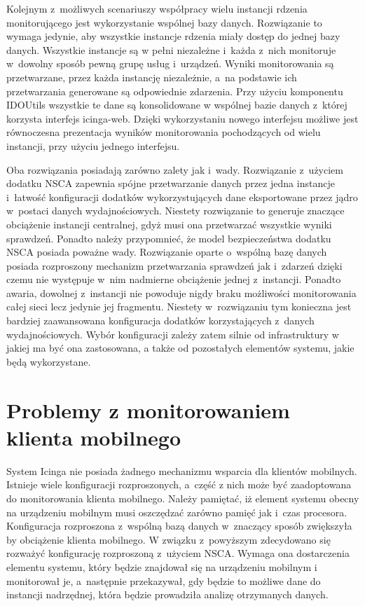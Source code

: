 Kolejnym z~możliwych scenariuszy współpracy wielu instancji rdzenia
monitorującego jest wykorzystanie wspólnej bazy danych. Rozwiązanie to
wymaga jedynie, aby wszystkie instancje rdzenia miały dostęp do jednej
bazy danych. Wszystkie instancje są w pełni niezależne i~każda z~nich
monitoruje w~dowolny sposób pewną grupę usług i~urządzeń. Wyniki
monitorowania są przetwarzane, przez każda instancję niezależnie, a~na
podstawie ich przetwarzania generowane są odpowiednie zdarzenia. Przy
użyciu komponentu IDOUtils wszystkie te dane są konsolidowane w
wspólnej bazie danych z~której korzysta interfejs icinga-web. Dzięki
wykorzystaniu nowego interfejsu możliwe jest równoczesna prezentacja
wyników monitorowania pochodzących od wielu instancji, przy użyciu
jednego interfejsu.

Oba rozwiązania posiadają zarówno zalety jak i~wady. Rozwiązanie
z~użyciem dodatku NSCA zapewnia spójne przetwarzanie danych przez
jedna instancje i~łatwość konfiguracji dodatków wykorzystujących dane
eksportowane przez jądro w~postaci danych wydajnościowych. Niestety
rozwiązanie to generuje znaczące obciążenie instancji centralnej, gdyż
musi ona przetwarzać wszystkie wyniki sprawdzeń. Ponadto należy
przypomnieć, że model bezpieczeństwa dodatku NSCA posiada poważne
wady. Rozwiązanie oparte o~wspólną bazę danych posiada rozproszony
mechanizm przetwarzania sprawdzeń jak i~zdarzeń dzięki czemu nie
występuje w~nim nadmierne obciążenie jednej z~instancji. Ponadto
awaria, dowolnej z~instancji nie powoduje nigdy braku możliwości
monitorowania całej sieci lecz jedynie jej fragmentu. Niestety
w~rozwiązaniu tym konieczna jest bardziej zaawansowana konfiguracja
dodatków korzystających z~danych wydajnościowych. Wybór konfiguracji
zależy zatem silnie od infrastruktury w jakiej ma być ona zastosowana,
a także od pozostałych elementów systemu, jakie będą wykorzystane.


\section[Problemy][Problemy z monitorowaniem klienta mobilnego]{Problemy z monitorowaniem klienta mobilnego}

System Icinga nie posiada żadnego mechanizmu wsparcia dla klientów
mobilnych. Istnieje wiele konfiguracji rozproszonych, a~część z nich
może być zaadoptowana do monitorowania klienta mobilnego. Należy
pamiętać, iż element systemu obecny na urządzeniu mobilnym musi
oszczędzać zarówno pamięć jak i~czas procesora. Konfiguracja
rozproszona z~wspólną bazą danych w~znaczący sposób zwiększyła by
obciążenie klienta mobilnego. W związku z~powyższym zdecydowano się
rozważyć konfigurację rozproszoną z~użyciem NSCA. Wymaga ona
dostarczenia elementu systemu, który będzie znajdował się na
urządzeniu mobilnym i monitorował je, a~następnie przekazywał, gdy
będzie to możliwe dane do instancji nadrzędnej, która będzie
prowadziła analizę otrzymanych danych.

